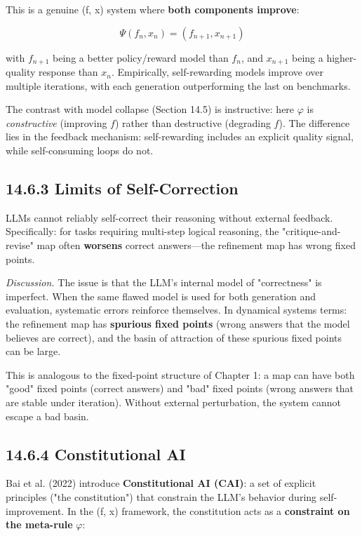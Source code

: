 This is a genuine (f, x) system where \textbf{both components improve}:

\[\Psi(f_n, x_n) = (f_{n+1}, x_{n+1})\]

with $f_{n+1}$ being a better policy/reward model than $f_n$, and $x_{n+1}$ being a higher-quality response than $x_n$. Empirically, self-rewarding models improve over multiple iterations, with each generation outperforming the last on benchmarks.

The contrast with model collapse (Section 14.5) is instructive: here $\varphi$ is \textit{constructive} (improving $f$) rather than destructive (degrading $f$). The difference lies in the feedback mechanism: self-rewarding includes an explicit quality signal, while self-consuming loops do not.

\subsection{14.6.3 Limits of Self-Correction}

\begin{theorem}
LLMs cannot reliably self-correct their reasoning without external feedback. Specifically: for tasks requiring multi-step logical reasoning, the "critique-and-revise" map often \textbf{worsens} correct answers---the refinement map has wrong fixed points.

\textit{Discussion.} The issue is that the LLM's internal model of "correctness" is imperfect. When the same flawed model is used for both generation and evaluation, systematic errors reinforce themselves. In dynamical systems terms: the refinement map has \textbf{spurious fixed points} (wrong answers that the model believes are correct), and the basin of attraction of these spurious fixed points can be large.

This is analogous to the fixed-point structure of Chapter 1: a map can have both "good" fixed points (correct answers) and "bad" fixed points (wrong answers that are stable under iteration). Without external perturbation, the system cannot escape a bad basin.
\end{theorem}

\subsection{14.6.4 Constitutional AI}

Bai et al. (2022) introduce \textbf{Constitutional AI (CAI)}: a set of explicit principles ("the constitution") that constrain the LLM's behavior during self-improvement. In the (f, x) framework, the constitution acts as a \textbf{constraint on the meta-rule} $\varphi$:

